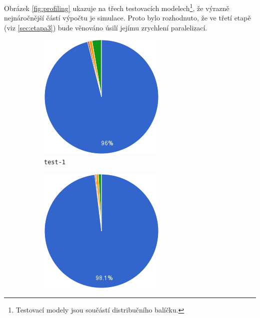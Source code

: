 \documentclass{parasim}
\begin{document}
Obrázek \ref{fig:profiling} ukazuje na třech testovacích modelech\footnote{Testovací modely jsou součástí distribučního balíčku.},
že výrazně nejnáročnější částí výpočtu je simulace. Proto bylo rozhodnuto, že ve třetí etapě (viz \ref{sec:etapa3}) bude
věnováno úsilí jejímu zrychlení paralelizací.

\begin{figure}[h!]
	\centering
	\begin{subfigure}[b]{0.3\textwidth}
		\centering
		\includegraphics[width=\textwidth]{1.0.0.M2/test-1a.png}
		\caption{\texttt{test-1}}
	\end{subfigure}
	\begin{subfigure}[b]{0.3\textwidth}
		\centering
		\includegraphics[width=\textwidth]{1.0.0.M2/test-2a.png}

\end{subfigure}
\end{figure}
\end{document}
